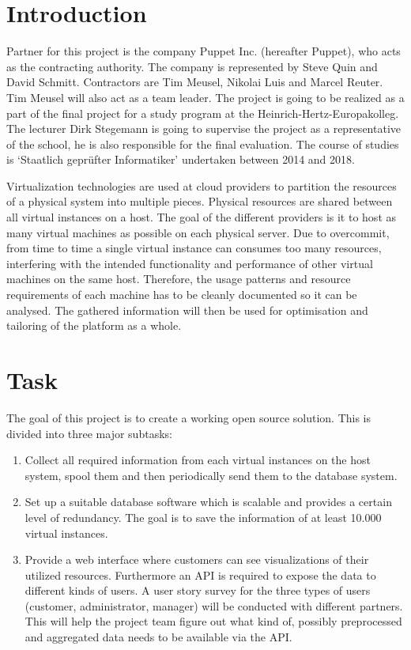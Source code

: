 \section{Introduction}

Partner for this project is the company Puppet Inc. (hereafter Puppet), who
acts as the contracting authority. The company is represented by Steve Quin and
David Schmitt. Contractors are Tim Meusel, Nikolai Luis and Marcel Reuter. Tim
Meusel will also act as a team leader. The project is going to be realized as a
part of the final project for a study program at the
Heinrich-Hertz-Europakolleg. The lecturer Dirk Stegemann is going to supervise
the project as a representative of the school, he is also responsible for the
final evaluation. The course of studies is `Staatlich geprüfter Informatiker'
undertaken between 2014 and 2018.

Virtualization technologies are used at cloud providers to partition the
resources of a physical system into multiple pieces. Physical resources are
shared between all virtual instances on a host. The goal of the different
providers is it to host as many virtual machines as possible on each physical
server. Due to overcommit, from time to time a single virtual instance can
consumes too many resources, interfering with the intended functionality and
performance of other virtual machines on the same host. Therefore, the usage
patterns and resource requirements of each machine has to be cleanly documented
so it can be analysed. The gathered information will then be used for
optimisation and tailoring of the platform as a whole.

\section{Task}

The goal of this project is to create a working open source solution. This is
divided into three major subtasks:
\begin{enumerate}
    \item Collect all required information from each virtual instances on the
          host system, spool them and then periodically send them to the database system.
    \item Set up a suitable database software which is scalable and provides a
          certain level of redundancy. The goal is to save the information of at least
          10.000 virtual instances.
    \item Provide a web interface where customers can see visualizations of
          their utilized resources. Furthermore an API is required to expose the data to
          different kinds of users. A user story survey for the three types of users
          (customer, administrator, manager) will be conducted with different partners.
          This will help the project team figure out what kind of, possibly preprocessed
          and aggregated data needs to be available via the API.
\end{enumerate}

